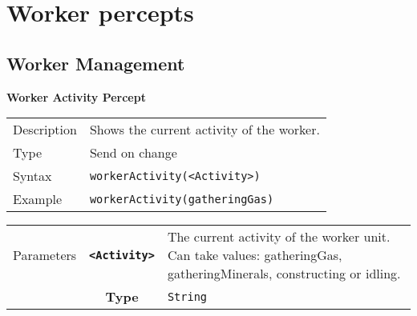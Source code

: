 \newpage
\section{Worker percepts}

\subsection{Worker Management}
\textbf{Worker Activity Percept}
\\
\begin{tabularx}{\textwidth}{lX}
 Description & Shows the current activity of the worker. \\
 Type & Send on change \\
 Syntax & \verb|workerActivity(<Activity>)| \\
 Example & \verb|workerActivity(gatheringGas)| \\
 \end{tabularx}
 \begin{tabularx}{\textwidth}{l | c | p{8cm}|}
 \cline{2-3}
 Parameters  & \textbf{\verb|<Activity>|} & The current activity of the worker unit. Can take values: gatheringGas, gatheringMinerals, constructing or idling. \\
            & \textbf{Type} & \verb|String| \\
            \cline{2-3}
\end{tabularx}\\
\\

